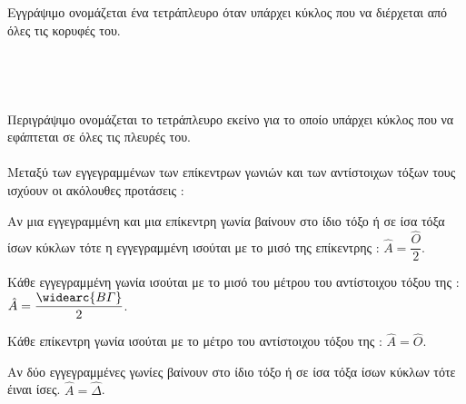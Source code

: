 \documentclass[twoside,nofonts,ektypwsh,shmeiwseis]{thewria}
\begin{document}
Εγγράψιμο ονομάζεται ένα τετράπλευρο όταν υπάρχει κύκλος που να διέρχεται από όλες τις κορυφές του.\\\\
\mbox{}\\\\\\
Περιγράψιμο ονομάζεται το τετράπλευρο εκείνο για το οποίο υπάρχει κύκλος που να εφάπτεται σε όλες τις πλευρές του.\\\\
\thewrhmata
{}
Μεταξύ των εγγεγραμμένων των επίκεντρων γωνιών και των αντίστοιχων τόξων τους ισχύουν οι ακόλουθες προτάσεις :
\begin{rlist}
\item Αν μια εγγεγραμμένη και μια επίκεντρη γωνία βαίνουν στο ίδιο τόξο ή σε ίσα τόξα ίσων κύκλων τότε η εγγεγραμμένη ισούται με το μισό της επίκεντρης : $ \hat{A}=\dfrac{\hat{O}}{2} $.
\item Κάθε εγγεγραμμένη γωνία ισούται με το μισό του μέτρου του αντίστοιχου τόξου της : $ \hat{A}=\dfrac{\widearc{B\varGamma}}{2} $.
\item Κάθε επίκεντρη γωνία ισούται με το μέτρο του αντίστοιχου τόξου της : $ \hat{A}=\hat{O} $.
\item Αν δύο εγγεγραμμένες γωνίες βαίνουν στο ίδιο τόξο ή σε ίσα τόξα ίσων κύκλων τότε έιναι ίσες. $ \hat{A}=\hat{\varDelta} $.
\end{rlist}
\end{document}
